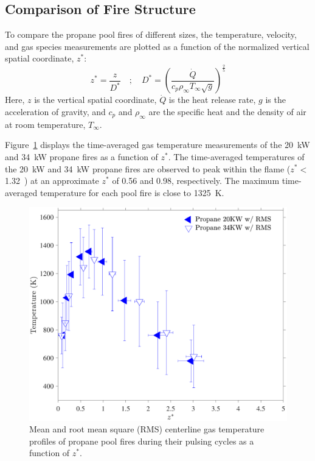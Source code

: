 \documentclass[12pt]{ussci}
\begin{document}
\subsection{Comparison of Fire Structure}
To compare the propane pool fires of different sizes, the temperature, velocity, and gas species measurements are plotted as a function of the normalized vertical spatial coordinate, $z^*$:
\begin{equation}\label{eq:Z_Star}
z^*=\frac{z}{D^*}  \quad ; \quad  D^* = \left(\frac{\dot{Q}}{c_{p}\rho_\infty T_\infty \sqrt{g}}\right)^{\frac{2}{5}}
\end{equation}
Here, $z$ is the vertical spatial coordinate, $\dot{Q}$ is the heat release rate, $g$ is the acceleration of gravity, and $c_p$ and $\rho_\infty$ are the specific heat and the density of air at room temperature, $T_\infty$.

Figure~\ref{fig:Temp_Comparison} displays the time-averaged gas temperature measurements of the 20~kW and 34~kW propane fires as a function of $z^*$.  The time-averaged temperatures of the 20~kW and 34~kW propane fires are observed to peak within the flame ($z^* <$ 1.32~\cite{Baum1989}) at an approximate $z^*$ of 0.56 and 0.98, respectively. The maximum time-averaged temperature for each pool fire is close to 1325~K. 
\begin{figure}[h!]
	\centering
\includegraphics[width=8 cm, keepaspectratio]{Temperature.pdf}
	\caption[Mean and RMS centerline gas temperature profiles]{Mean and root mean square (RMS) centerline gas temperature profiles of propane pool fires during their pulsing cycles as a function of $z^*$.}
	\label{fig:Temp_Comparison}
\end{figure}
\end{document}
